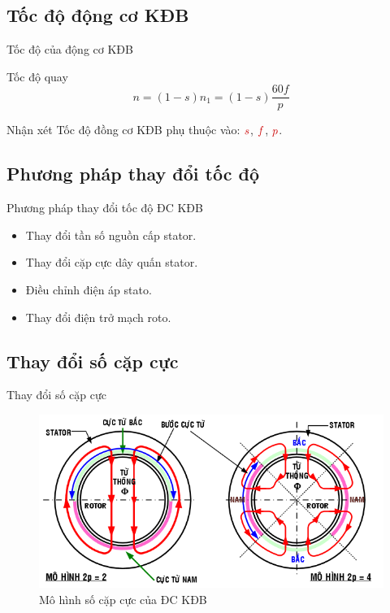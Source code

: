 \documentclass[20pt]{beamer}
\begin{document}
\subsection*{Tốc độ động cơ KĐB}
\begin{frame}{Tốc độ của động cơ KĐB}
	\begin{block}{Tốc độ quay}
		$$ n = \left({1-s}\right)n_1 = \left({1-s}\right) \dfrac{60f}{p}$$
	\end{block}

	\begin{block}{Nhận xét}
		\justifying
		Tốc độ đồng cơ KĐB phụ thuộc vào: $\textcolor{doden}{s}$, $\textcolor{doden}{f}$, $\textcolor{doden}{p}$.
	\end{block}
\end{frame}

\subsection*{Phương pháp thay đổi tốc độ}
\begin{frame}[t]{Phương pháp thay đổi tốc độ ĐC KĐB}
	\begin{itemize}
		\item Thay đổi tần số nguồn cấp stator.
		\item Thay đổi cặp cực dây quấn stator.
		\item Điều chỉnh điện áp stato.
		\item Thay đổi điện trở mạch roto.
	\end{itemize}
\end{frame}

\subsection*{Thay đổi số cặp cực}
\begin{frame}{Thay đổi số cặp cực}
	\begin{figure}
		\begin{center}
			\includegraphics[scale=.55]{images-chude2/2-and-4-pole-AC3P.png} 
		\end{center}
		\caption{Mô hình số cặp cực của ĐC KĐB}
	\end{figure}
\end{frame}
\end{document}
